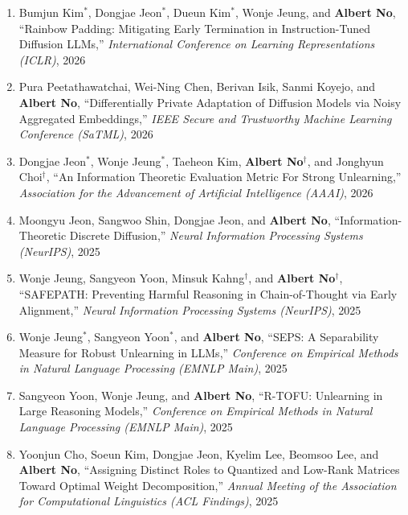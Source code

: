 \documentclass[10pt]{article}
\begin{document}
\begin{enumerate}[(C1)]
\item Bumjun Kim$^*$, Dongjae Jeon$^*$, Dueun Kim$^*$, Wonje Jeung, and {{\bf Albert No}},
``Rainbow Padding: Mitigating Early Termination in Instruction-Tuned Diffusion LLMs,''
{\it International Conference on Learning Representations (ICLR)}, 2026\\

\item Pura Peetathawatchai, Wei-Ning Chen, Berivan Isik, Sanmi Koyejo, and {{\bf Albert No}},
``Differentially Private Adaptation of Diffusion Models via Noisy Aggregated Embeddings,''
{\it IEEE Secure and Trustworthy Machine Learning Conference (SaTML)}, 2026\\

\item Dongjae Jeon$^*$, Wonje Jeung$^*$, Taeheon Kim, {{\bf Albert No}}$^\dagger$, and Jonghyun Choi$^\dagger$,
``An Information Theoretic Evaluation Metric For Strong Unlearning,''
{\it Association for the Advancement of Artificial Intelligence (AAAI)}, 2026\\

\item Moongyu Jeon, Sangwoo Shin, Dongjae Jeon, and {{\bf Albert No}},
``Information-Theoretic Discrete Diffusion,''
{\it Neural Information Processing Systems (NeurIPS)}, 2025\\

\item Wonje Jeung, Sangyeon Yoon, Minsuk Kahng$^\dagger$, and {{\bf Albert No}}$^\dagger$,
``SAFEPATH: Preventing Harmful Reasoning in Chain-of-Thought via Early Alignment,''
{\it Neural Information Processing Systems (NeurIPS)}, 2025\\

\item Wonje Jeung$^*$, Sangyeon Yoon$^*$, and {{\bf Albert No}},
``SEPS: A Separability Measure for Robust Unlearning in LLMs,''
{\it Conference on Empirical Methods in Natural Language Processing (EMNLP Main)}, 2025\\

\item Sangyeon Yoon, Wonje Jeung, and {{\bf Albert No}},
``R-TOFU: Unlearning in Large Reasoning Models,''
{\it Conference on Empirical Methods in Natural Language Processing (EMNLP Main)}, 2025\\

\item Yoonjun Cho, Soeun Kim, Dongjae Jeon, Kyelim Lee, Beomsoo Lee, and {{\bf Albert No}},
``Assigning Distinct Roles to Quantized and Low-Rank Matrices Toward Optimal Weight Decomposition,''
{\it Annual Meeting of the Association for Computational Linguistics (ACL Findings)}, 2025\\


\end{enumerate}
\end{document}
